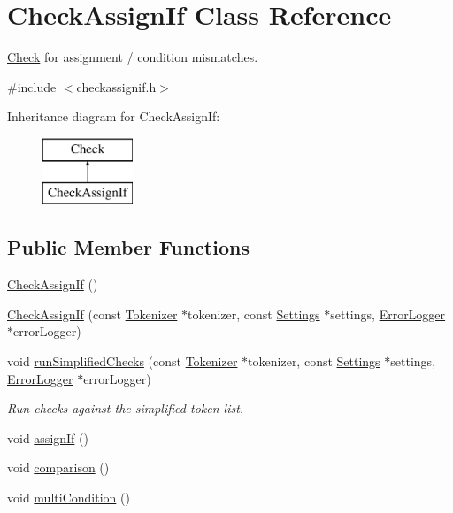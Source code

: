 \hypertarget{class_check_assign_if}{\section{Check\-Assign\-If Class Reference}
\label{class_check_assign_if}
}


\hyperlink{class_check}{Check} for assignment / condition mismatches.  




{\ttfamily \#include $<$checkassignif.\-h$>$}

Inheritance diagram for Check\-Assign\-If\-:\begin{figure}[H]
\begin{center}
\leavevmode
\includegraphics[height=2.000000cm]{class_check_assign_if}
\end{center}
\end{figure}
\subsection*{Public Member Functions}
\begin{DoxyCompactItemize}
\item 
\hyperlink{class_check_assign_if_ab183b18432bfaf364c8cc15898283ce4}{Check\-Assign\-If} ()
\item 
\hyperlink{class_check_assign_if_ab5cfb7f65863318f44e43f406a584748}{Check\-Assign\-If} (const \hyperlink{class_tokenizer}{Tokenizer} $\ast$tokenizer, const \hyperlink{class_settings}{Settings} $\ast$settings, \hyperlink{class_error_logger}{Error\-Logger} $\ast$error\-Logger)
\item 
void \hyperlink{class_check_assign_if_a9f01cfc5b830fd7439e0b83b0590f53c}{run\-Simplified\-Checks} (const \hyperlink{class_tokenizer}{Tokenizer} $\ast$tokenizer, const \hyperlink{class_settings}{Settings} $\ast$settings, \hyperlink{class_error_logger}{Error\-Logger} $\ast$error\-Logger)
\begin{DoxyCompactList}\small\item\em Run checks against the simplified token list. \end{DoxyCompactList}\item 
void \hyperlink{class_check_assign_if_a8d44b6ba0552d39dc83f0a92eda3a6d1}{assign\-If} ()
\item 
void \hyperlink{class_check_assign_if_a43705ae6a98e3ad05592a66d4e7f40d4}{comparison} ()
\item 
void \hyperlink{class_check_assign_if_a82cfc674ce26af08bae2be56a18fb60b}{multi\-Condition} ()
\end{DoxyCompactItemize}
